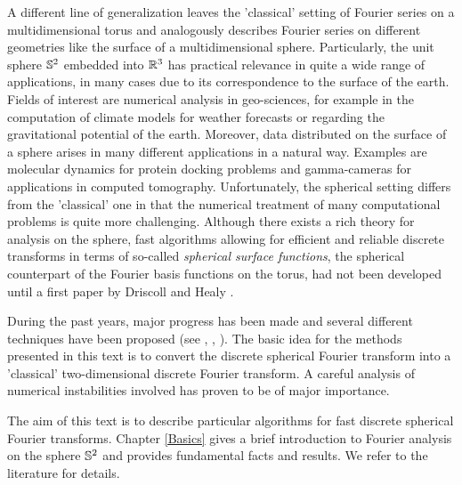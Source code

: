 A different line of generalization leaves the 'classical' setting of 
Fourier series on a multidimensional torus and analogously describes
Fourier series on different geometries like the surface of a
multidimensional sphere. Particularly, the unit sphere $\mathbb{S}^2$ 
embedded into $\mathbb{R}^3$ has practical relevance in quite a wide range of 
applications, in many cases due to its correspondence to the surface 
of the earth. Fields of interest are numerical analysis in
geo-sciences, for example in the computation of climate models for
weather forecasts or regarding the gravitational potential of the 
earth. Moreover, data distributed on the surface of a sphere arises
in many different applications in a natural way. Examples are
molecular dynamics for protein docking problems and 
gamma-cameras for applications in computed tomography.
Unfortunately, the spherical setting differs from the 'classical' 
one in that the numerical treatment of many computational problems
is quite more challenging. Although there exists a rich theory for 
analysis on the sphere, fast algorithms allowing for efficient and
reliable discrete transforms in terms of so-called 
\emph{spherical surface functions}, the spherical counterpart of the 
Fourier basis functions on the torus,
had not been developed until a first paper by Driscoll and Healy 
\cite{drhe}.
 
During the past years, major progress has been made and several 
different techniques have been proposed (see \cite{HeRoKoMo}, 
\cite{suta}, \cite{roty}). The basic idea for the 
methods presented in this text is to convert the discrete spherical 
Fourier transform into a 'classical' two-dimensional discrete 
Fourier transform. A careful analysis
of numerical instabilities involved has proven to be of major 
importance.

The aim of this text is to describe particular algorithms for fast discrete
spherical Fourier transforms. Chapter \ref{Basics} gives a brief 
introduction to Fourier analysis on the sphere $\mathbb{S}^2$ and 
provides fundamental facts and results. We refer to the literature for 
details.


